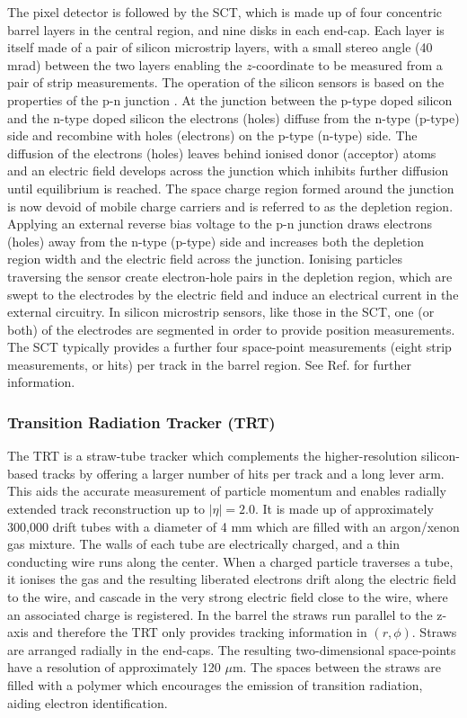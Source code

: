 The pixel detector is followed by the SCT, which is made up of four concentric barrel layers in the central region, and nine disks in each end-cap. Each layer is itself made of a pair of silicon microstrip layers, with a small stereo angle (40 mrad) between the two layers enabling the $z$-coordinate to be measured from a pair of strip measurements. The operation of the silicon sensors is based on the properties of the p-n junction \cite{6773080}. At the junction between the p-type doped silicon and the n-type doped silicon the electrons (holes) diffuse from the n-type (p-type) side and recombine with holes (electrons) on the p-type (n-type) side. The diffusion of the electrons (holes) leaves behind ionised donor (acceptor) atoms and an electric field develops across the junction which inhibits further diffusion until equilibrium is reached. The space charge region formed around the junction is now devoid of mobile charge carriers and is referred to as the depletion region. Applying an external reverse bias voltage to the p-n junction draws electrons (holes) away from the n-type (p-type) side and increases both the depletion region width and the electric field across the junction. Ionising particles traversing the sensor create electron-hole pairs in the depletion region, which are swept to the electrodes by the electric field and induce an electrical current in the external circuitry. In silicon microstrip sensors, like those in the SCT, one (or both) of the electrodes are segmented in order to provide position measurements. The SCT typically provides a further four space-point measurements (eight strip measurements, or hits) per track in the barrel region. See Ref. \cite{inner-detector-TDR} for further information.


\subsubsection{Transition Radiation Tracker (TRT)}

The TRT is a straw-tube tracker which complements the higher-resolution silicon- based tracks by offering a larger number of hits per track and a long lever arm. This aids the accurate measurement of particle momentum and enables radially extended track reconstruction up to $ \lvert \eta \rvert = 2.0$. It is made up of approximately 300,000 drift tubes with a diameter of 4 mm which are filled with an argon/xenon gas mixture. The walls of each tube are electrically charged, and a thin conducting wire runs along the center. When a charged particle traverses a tube, it ionises the gas and the resulting liberated electrons drift along the electric field to the wire, and cascade in the very strong electric field close to the wire, where an associated charge is registered. In the barrel the straws run parallel to the z-axis and therefore the TRT only provides tracking information in $(r, \phi)$. Straws are arranged radially in the end-caps. The resulting two-dimensional space-points have a resolution of approximately 120 $\mu$m. The spaces between the straws are filled with a polymer which encourages the emission of transition radiation, aiding electron identification.

